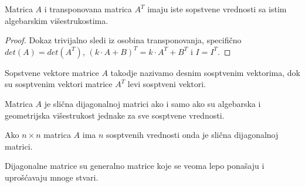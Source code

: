 \documentclass{article}
\begin{document}
\begin{theorem}
  Matrica $A$ i transponovana matrica $A^T$ imaju iste sopstvene vrednosti sa istim algebarskim višestrukostima.
\end{theorem}

\begin{proof}
  Dokaz trivijalno sledi iz osobina transponovanja, specifično $det(A) = det(A^T)$, $(k \cdot A + B)^T = k \cdot A^T + B^T$ i $I = I^T$.
\end{proof}

\begin{definition}
  Sopstvene vektore matrice $A$ takodje nazivamo desnim sosptvenim vektorima, dok su sosptvenim vektori matrice $A^T$ levi sosptveni vektori.
\end{definition}

\begin{theorem}
  Matrica $A$ je slična dijagonalnoj matrici ako i samo ako su algebarska i geometrijska višestrukost jednake za sve sosptvene vrednosti.
\end{theorem}

\begin{corollary}
  Ako $n \times n$ matrica $A$ ima $n$ sosptvenih vrednosti onda je slična dijagonalnoj matrici.
\end{corollary}

Dijagonalne matrice su generalno matrice koje se veoma lepo ponašaju i uprošćavaju mnoge stvari.
\end{document}
